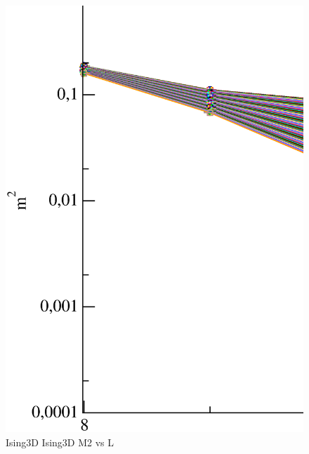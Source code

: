 \begin{figure}[!htpb]
  \centering
  \includegraphics[width=\textwidth]{./plots/Ising3D/Ising3D_M2_vs_L.eps}
  \caption{Ising3D Ising3D M2 vs L}
\end{figure}

